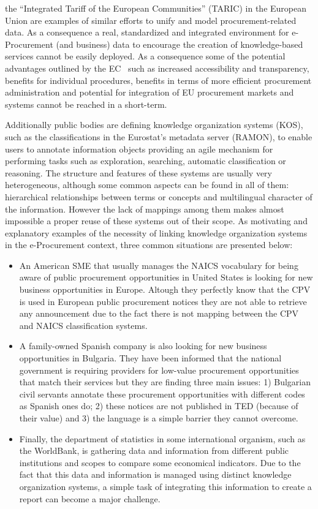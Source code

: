 the ``Integrated Tariff of the European Communities'' (TARIC) in the European Union are examples of similar efforts to unify 
and model procurement-related data. As a consequence a real, standardized and integrated environment for e-Procurement (and business) data 
to encourage the creation of knowledge-based services cannot be easily deployed. As a consequence some of the potential advantages 
outlined by the EC~\cite{d2010} such as increased accessibility and transparency, benefits for individual procedures, 
benefits in terms of more efficient procurement administration and potential for integration of EU procurement markets and systems cannot be reached in a 
short-term. 

Additionally public bodies are defining knowledge organization systems (KOS), such as the classifications in the Eurostat's metadata server (RAMON), 
to enable users to annotate information objects providing an agile mechanism for performing tasks such as exploration, searching, 
automatic classification or reasoning. The structure and features of these systems are usually very heterogeneous, 
although some common aspects can be found in all of them: hierarchical relationships between terms or concepts and multilingual character of the information. 
However the lack of mappings among them makes almost impossible a proper reuse of these systems out of their scope. As motivating and 
explanatory examples of the necessity of linking knowledge organization systems in the e-Procurement context, 
three common situations are presented below:

\begin{itemize}
 \item An American SME that usually manages the NAICS vocabulary for being aware of public procurement 
opportunities in United States is looking for new business opportunities in Europe. Altough they perfectly 
know that the CPV is used in European public procurement notices they are not able to retrieve 
any announcement due to the fact there is not mapping between the CPV and NAICS classification systems.
\item A family-owned Spanish company is also looking for new business opportunities in Bulgaria. They have been informed 
that the national government is requiring providers for low-value procurement opportunities that match their services but they 
are finding three main issues: 1) Bulgarian civil servants annotate these procurement opportunities with different codes as Spanish ones do; 2) 
these notices are not published in TED (because of their value) and 3) the language is a simple barrier they cannot overcome.
\item Finally, the department of statistics in some international organism, such as the WorldBank, is gathering data and information 
from different public institutions and scopes to compare some economical indicators. Due to the fact that this data and information is managed 
using distinct knowledge organization systems, a simple task of integrating this information to create a report can become a major challenge.
\end{itemize}

